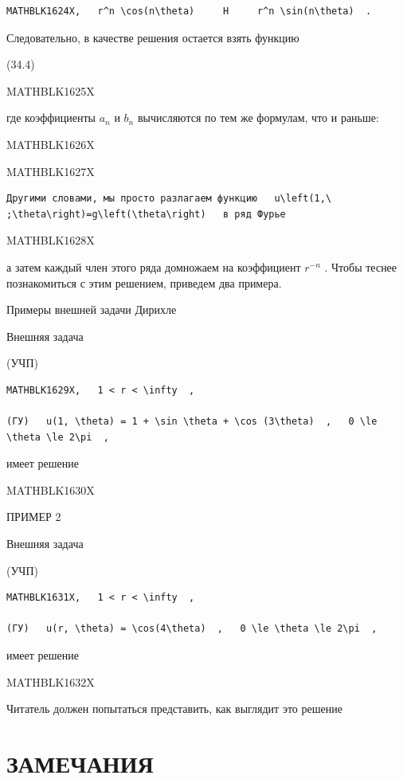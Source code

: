 \documentclass[
]{article}
\begin{document}
\begin{verbatim}
MATHBLK1624X,   r^n \cos(n\theta)     H     r^n \sin(n\theta)  .
\end{verbatim}

Следовательно, в качестве решения остается взять функцию

(34.4)

MATHBLK1625X

где коэффициенты \(a_n\) и \(b_n\) вычисляются по тем же формулам, что и
раньше:

MATHBLK1626X

MATHBLK1627X

\begin{verbatim}
Другими словами, мы просто разлагаем функцию   u\left(1,\ ;\theta\right)=g\left(\theta\right)   в ряд Фурье
\end{verbatim}

MATHBLK1628X

а затем каждый член этого ряда домножаем на коэффициент \(r^{-n}\) .
Чтобы теснее познакомиться с этим решением, приведем два примера.

Примеры внешней задачи Дирихле

Внешняя задача

(УЧП)

\begin{verbatim}
MATHBLK1629X,   1 < r < \infty  ,

(ГУ)   u(1, \theta) = 1 + \sin \theta + \cos (3\theta)  ,   0 \le \theta \le 2\pi  ,
\end{verbatim}

имеет решение

MATHBLK1630X

ПРИМЕР 2

Внешняя задача

(УЧП)

\begin{verbatim}
MATHBLK1631X,   1 < r < \infty  ,

(ГУ)   u(r, \theta) = \cos(4\theta)  ,   0 \le \theta \le 2\pi  ,
\end{verbatim}

имеет решение

MATHBLK1632X

Читатель должен попытаться представить, как выглядит это решение

\section{ЗАМЕЧАНИЯ}\label{ux437ux430ux43cux435ux447ux430ux43dux438ux44f-13}
\end{document}
